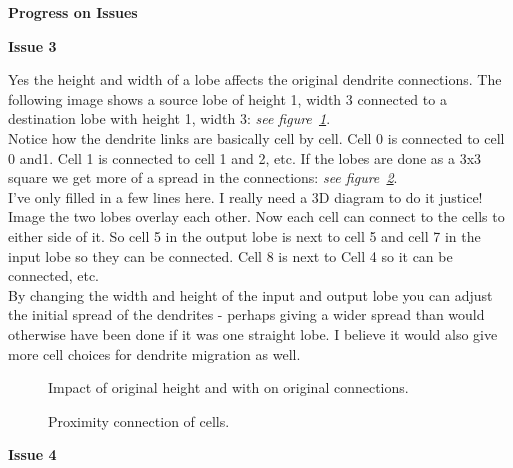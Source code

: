 \documentclass[11pt,twoside,a4paper]{article}
\begin{document}
\textbf{Progress on Issues}%

\textbf{Issue 3}%

	Yes the height and width of a lobe affects the original dendrite connections. The following image shows a source lobe of height 1, width 3 connected to a destination lobe with height 1, width 3: \emph{see figure~\ref{fig:dendrite0}}.~\\
	
	Notice how the dendrite links are basically cell by cell. Cell 0 is connected to cell 0 and1. Cell 1 is connected to cell 1 and 2, etc. If the lobes are done as a 3x3 square we get more of a spread in the connections: \emph{see figure~\ref{fig:dendrite1}}. ~\\
	
	I've only filled in a few lines here. I really need a 3D diagram to do it justice! Image the two lobes overlay each other. Now each cell can connect to the cells to either side of it. So cell 5 in the output lobe is next to cell 5 and cell 7 in the input lobe so they can be connected. Cell 8 is next to Cell 4 so it can be connected, etc. ~\\
	
	By changing the width and height of the input and output lobe you can adjust the initial spread of the dendrites - perhaps giving a wider spread than would otherwise have been done if it was one straight lobe. I believe it would also give more cell choices for dendrite migration as well. ~\\

\begin{minipage}[h]{6.00cm}
	\begin{figure}[H]
		\centerline {}
		\caption{Impact of original height and with on original connections. }
		\label{fig:dendrite0}
	\end{figure}
\end{minipage} \hfill \begin{minipage}[h]{13.50cm}
	\begin{figure}[H]
		\centerline {}
		\caption{Proximity connection of cells. }
		\label{fig:dendrite1}
	\end{figure}
\end{minipage} %

\textbf{Issue 4} %
\end{document}
